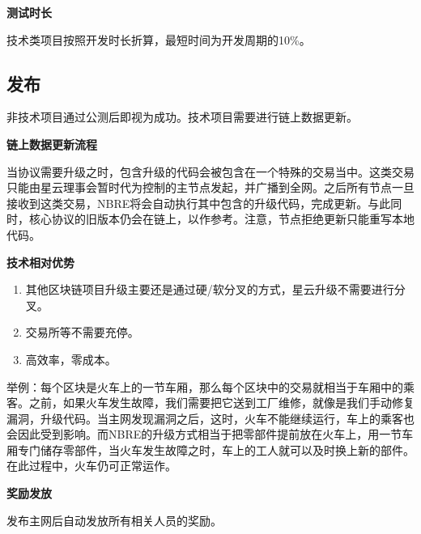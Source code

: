 \textbf{测试时长}

技术类项目按照开发时长折算，最短时间为开发周期的10\%。

\subsection{发布}
非技术项目通过公测后即视为成功。技术项目需要进行链上数据更新。

\textbf{链上数据更新流程}

当协议需要升级之时，包含升级的代码会被包含在一个特殊的交易当中。这类交易只能由星云理事会暂时代为控制的主节点发起，并广播到全网。之后所有节点一旦接收到这类交易，NBRE将会自动执行其中包含的升级代码，完成更新。与此同时，核心协议的旧版本仍会在链上，以作参考。注意，节点拒绝更新只能重写本地代码。

\textbf{技术相对优势}
\begin{enumerate}
	\item 其他区块链项目升级主要还是通过硬/软分叉的方式，星云升级不需要进行分叉。
\item 交易所等不需要充停。
\item 高效率，零成本。
\end{enumerate}

举例：每个区块是火车上的一节车厢，那么每个区块中的交易就相当于车厢中的乘客。之前，如果火车发生故障，我们需要把它送到工厂维修，就像是我们手动修复漏洞，升级代码。当主网发现漏洞之后，这时，火车不能继续运行，车上的乘客也会因此受到影响。而NBRE的升级方式相当于把零部件提前放在火车上，用一节车厢专门储存零部件，当火车发生故障之时，车上的工人就可以及时换上新的部件。在此过程中，火车仍可正常运作。

\textbf{奖励发放}

发布主网后自动发放所有相关人员的奖励。

